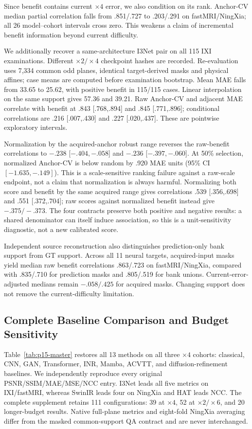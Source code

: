 \documentclass[journal,10pt]{IEEEtran}
\begin{document}
Since benefit contains current $\times4$ error, we also condition on its rank. Anchor-CV median partial correlation falls from .851/.727 to .203/.291 on fastMRI/NingXia; all 26 model--cohort intervals cross zero. This weakens a claim of incremental benefit information beyond current difficulty.

We additionally recover a same-architecture I3Net pair on all 115 IXI examinations. Different $\times2/\times4$ checkpoint hashes are recorded. Re-evaluation uses 7,334 common odd planes, identical target-derived masks and physical affines; case means are computed before examination bootstrap. Mean MAE falls from 33.65 to 25.62, with positive benefit in 115/115 cases. Linear interpolation on the same support gives 57.36 and 39.21. Raw Anchor-CV and adjacent MAE correlate with benefit at .843 [.768,.894] and .845 [.771,.896]; conditional correlations are .216 [.007,.430] and .227 [.020,.437]. These are pointwise exploratory intervals.

Normalization by the acquired-anchor robust range reverses the raw-benefit correlations to $-.238$ [$-.404,-.058$] and $-.236$ [$-.397,-.060$]. At 50\% selection, normalized Anchor-CV is below random by .920 MAE units (95\% CI $[-1.635,-.149]$). This is a scale-sensitive ranking failure against a raw-scale endpoint, not a claim that normalization is always harmful. Normalizing both score and benefit by the same acquired range gives correlations .539 [.356,.698] and .551 [.372,.704]; raw scores against normalized benefit instead give $-.375/-.373$. The four contracts preserve both positive and negative results: a shared denominator can itself induce association, so this is a unit-sensitivity diagnostic, not a new calibrated score.

Independent source reconstruction also distinguishes prediction-only bank support from GT support. Across all 11 neural targets, acquired-input masks yield median raw benefit correlations .863/.723 on fastMRI/NingXia, compared with .835/.710 for prediction masks and .805/.519 for bank unions. Current-error-adjusted medians remain $-.058/.425$ for acquired masks. Changing support does not remove the current-difficulty limitation.



\subsection{Complete Baseline Comparison and Budget Sensitivity}
Table~\ref{tab:p15-master} restores all 13 methods on all three $\times4$ cohorts: classical, CNN, GAN, Transformer, INR, Mamba, ACVTT, and diffusion-refinement baselines. We independently reproduce every original PSNR/SSIM/MAE/MSE/NCC entry. I3Net leads all five metrics on IXI/fastMRI, whereas SwinIR leads four on NingXia and HAT leads NCC. The complete supplement retains 111 configurations: 39 at $\times4$, 52 at $\times2/\times6$, and 20 longer-budget results. Native full-plane metrics and eight-fold NingXia averaging differ from the masked common-support QA contract and are never interchanged.
\end{document}
